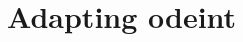 \documentclass[1p]{elsarticle}
\newcommand{\code}[1]{\lstinline|#1|}
\newcommand{\figref}[1]{Fig.~\ref{#1}}
\begin{document}
%
%

\section{Adapting odeint}
\end{document}

